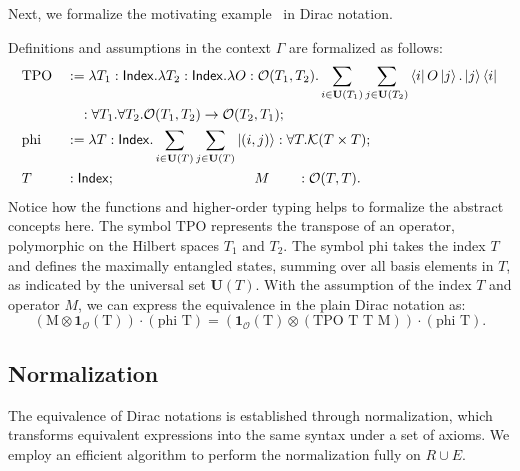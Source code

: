Next, we formalize the motivating example~ in
Dirac notation.
\begin{example}
    \label{ex: formalizing motivating}
    Definitions and assumptions in the context \( \Gamma \) are formalized as follows:
    \begin{align*}
        & \text{TPO} && := \lambda T_1 : \mathsf{Index}. \lambda T_2 : \mathsf{Index}. \lambda O : \mathcal{O}(T_1, T_2). \sum_{i \in \mathbf{U}(T_1)} \sum_{j \in \mathbf{U}(T_2)} \bra{i} O \ket{j} . \ket{j}\bra{i} \\
        & &&\quad : \forall T_1. \forall T_2. \mathcal{O}(T_1, T_2) \to \mathcal{O}(T_2, T_1); \\
        &\text{phi} &&:= \lambda T : \mathsf{Index}. \sum_{i \in \mathbf{U}(T)} \sum_{j \in \mathbf{U}(T)} \ket{(i, j)} : \forall T.\mathcal{K}(T \times T); \\
        & T && : \mathsf{Index};  \qquad \qquad \qquad \qquad \qquad M \qquad : \mathcal{O}(T, T).
    \end{align*}
    Notice how the functions and higher-order typing helps to formalize the abstract concepts here.
    The symbol \( \text{TPO} \) represents the transpose of an operator, polymorphic on the Hilbert spaces \( T_1 \) and \( T_2 \). 
    The symbol \( \text{phi} \) takes the index \( T \) and defines the maximally entangled states, summing over all basis elements in \( T \), as indicated by the universal set \( \mathbf{U}(T) \).
    With the assumption of the index \( T \) and operator \( M \), we can express the equivalence in the plain Dirac notation as:
    \[
    (\textrm{M} \otimes \mathbf{1}_\mathcal{O}(\textrm{T})) \cdot (\textrm{phi T}) = (\mathbf{1}_\mathcal{O}(\textrm{T}) \otimes (\textrm{TPO T T M})) \cdot (\textrm{phi T}).
    \]
\end{example}



\subsection{Normalization}

The equivalence of Dirac notations is established through normalization, which transforms equivalent expressions into the same syntax under a set of axioms. We employ an efficient algorithm to perform the normalization fully on $R \cup E$.

